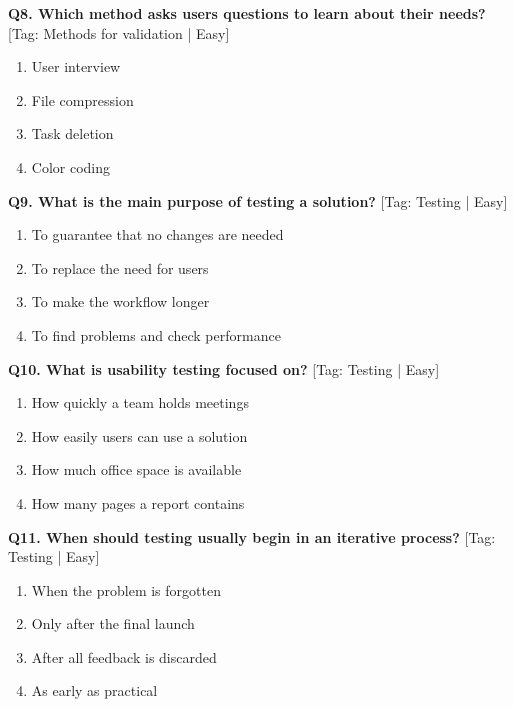 \noindent\textbf{Q8. Which method asks users questions to learn about their needs?} \hfill [Tag: Methods for validation | Easy]
\begin{enumerate}[label=(\alph*),topsep=2pt,itemsep=1pt,partopsep=0pt,parsep=0pt]
    \item {User interview}
    \item {File compression}
    \item {Task deletion}
    \item {Color coding}
\end{enumerate}
\vspace{2mm}

\noindent\textbf{Q9. What is the main purpose of testing a solution?} \hfill [Tag: Testing | Easy]
\begin{enumerate}[label=(\alph*),topsep=2pt,itemsep=1pt,partopsep=0pt,parsep=0pt]
    \item {To guarantee that no changes are needed}
    \item {To replace the need for users}
    \item {To make the workflow longer}
    \item {To find problems and check performance}
\end{enumerate}
\vspace{2mm}

\noindent\textbf{Q10. What is usability testing focused on?} \hfill [Tag: Testing | Easy]
\begin{enumerate}[label=(\alph*),topsep=2pt,itemsep=1pt,partopsep=0pt,parsep=0pt]
    \item {How quickly a team holds meetings}
    \item {How easily users can use a solution}
    \item {How much office space is available}
    \item {How many pages a report contains}
\end{enumerate}
\vspace{2mm}

\noindent\textbf{Q11. When should testing usually begin in an iterative process?} \hfill [Tag: Testing | Easy]
\begin{enumerate}[label=(\alph*),topsep=2pt,itemsep=1pt,partopsep=0pt,parsep=0pt]
    \item {When the problem is forgotten}
    \item {Only after the final launch}
    \item {After all feedback is discarded}
    \item {As early as practical}
\end{enumerate}
\vspace{2mm}

